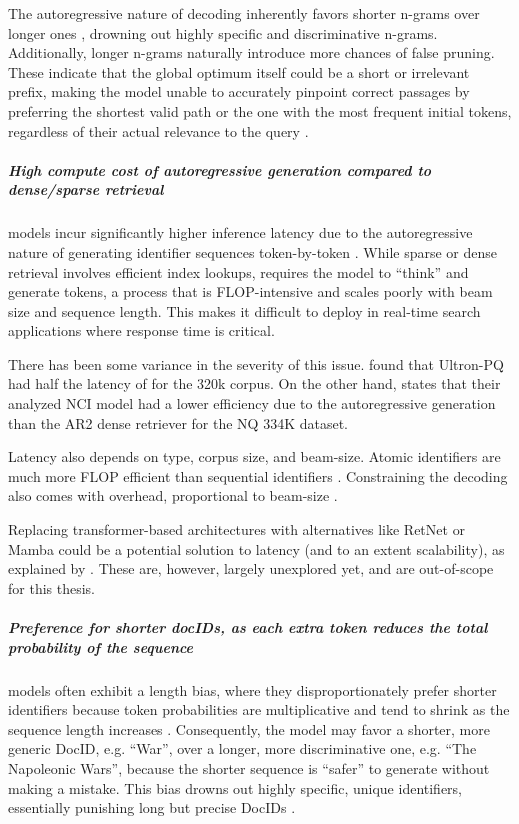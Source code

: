 The autoregressive nature of decoding inherently favors shorter n-grams over longer ones \cite{peiwen-yuan-generative-dense}, drowning out highly specific and discriminative n-grams. Additionally, longer n-grams naturally introduce more chances of false pruning. These indicate that the global optimum itself could be a short or irrelevant prefix, making the model unable to accurately pinpoint correct passages by preferring the shortest valid  path or the one with the most frequent initial tokens, regardless of their actual relevance to the query \cite{hansi-zeng-scalable-and}.

\subparagraph{High compute cost of autoregressive generation compared to dense/sparse retrieval}
 models incur significantly higher inference latency due to the autoregressive nature of generating identifier sequences token-by-token \cite{peiwen-yuan-generative-dense}. While sparse or dense retrieval involves efficient index lookups,  requires the model to ``think'' and generate tokens, a process that is FLOP-intensive and scales poorly with beam size and sequence length. This makes it difficult to deploy  in real-time search applications where response time is critical.

There has been some variance in the severity of this issue. \citet{yujia-zhou-ultron-an} found that Ultron-PQ had half the latency of  for the  320k \cite{payal-bajaj-ms-marco} corpus. On the other hand, \citet{peiwen-yuan-generative-dense} states that their analyzed NCI  \cite{yujing-wang-a-neural} model had a lower efficiency due to the autoregressive  generation than the AR2 dense retriever \cite{zhang-hang-adversarial-retriever} for the NQ 334K dataset.

Latency also depends on  type, corpus size, and beam-size. Atomic identifiers are much more FLOP efficient than sequential identifiers \cite{ronak-pradeep-how-does}. Constraining the decoding also comes with overhead, proportional to beam-size \cite{michele-bevilacqua-autoregressive-search}.

Replacing transformer-based architectures with alternatives like RetNet \cite{sun-retnet} or Mamba \cite{gu-mamba} could be a potential solution to latency (and to an extent scalability), as explained by \citet{xiaoxi-li-from-matching}. These are, however, largely unexplored yet, and are out-of-scope for this thesis. 

\subparagraph{Preference for shorter docIDs, as each extra token reduces the total probability of the sequence}
 models often exhibit a length bias, where they disproportionately prefer shorter identifiers because token probabilities are multiplicative and tend to shrink as the sequence length increases \cite{peiwen-yuan-generative-dense, michele-bevilacqua-autoregressive-search, yongqi-li-multiview-identifiers, peitian-zhang-generative-retrieval}. Consequently, the model may favor a shorter, more generic DocID, e.g. ``War'', over a longer, more discriminative one, e.g. ``The Napoleonic Wars'', because the shorter sequence is ``safer'' to generate without making a mistake. This bias drowns out highly specific, unique identifiers, essentially punishing long but precise DocIDs \cite{hansi-zeng-scalable-and}.

